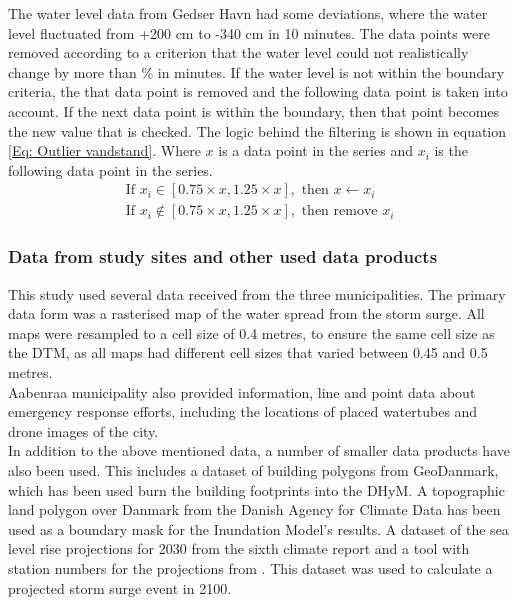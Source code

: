 The water level data from Gedser Havn had some deviations, where the water level fluctuated from +200 cm to -340 cm in 10 minutes. The data points were removed according to a criterion that the water level could not realistically change by more than \% in minutes. If the water level is not within the boundary criteria, the that data point is removed and the following data point is taken into account. If the next data point is within the boundary, then that point becomes the new value that is checked. The logic behind the filtering is shown in equation \ref{Eq: Outlier vandstand}. Where $x$ is a data point in the series and $x_i$ is the following data point in the series.
\begin{align} \label{Eq: Outlier vandstand}
	\text{If } x_i \in [0.75\times x, 1.25\times x], \text{ then } x \leftarrow x_i \nonumber \\
	\text{If } x_i \notin [0.75\times x, 1.25\times x], \text{ then remove } x_i
\end{align}

\subsubsection{Data from study sites and other used data products}
This study used several data received from the three municipalities. The primary data form was a rasterised map of the water spread from the storm surge. All maps were resampled to a cell size of 0.4 metres, to ensure the same cell size as the DTM, as all maps had different cell sizes that varied between 0.45 and 0.5 metres.\\
Aabenraa municipality also provided information, line and point data about emergency response efforts, including the locations of placed watertubes and drone images of the city.\\

In addition to the above mentioned data, a number of smaller data products have also been used. This includes a dataset of building polygons from GeoDanmark, which has been used burn the building footprints into the DHyM. A topographic land polygon over Danmark from the Danish Agency for Climate Data has been used as a boundary mask for the Inundation Model's results. A dataset of the sea level rise projections for 2030 from the sixth \cite{ipcc_report_AR6, garner_ipcc_2021} climate report and a tool with station numbers for the projections from \cite{NASA_tool}. This dataset was used to calculate a projected storm surge event in 2100.